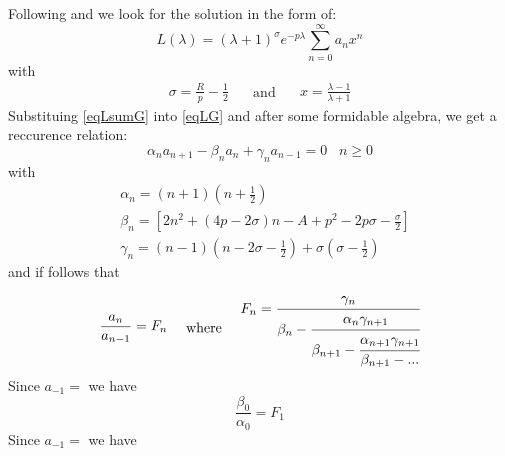 Following \cite{Bates1} and \cite{H2Plus2d2} we look for the solution in the form of:
\begin{equation}\label{eqLsumG}
L(\lambda) = \left(\lambda +1\right)^\sigma e^{-p\lambda}\sum_{n=0}^{\infty}{a_nx^n}
\end{equation}
with
\begin{equation}
\begin{split}
\sigma = \frac{R}{p} - \frac{1}{2}
\end{split}
\quad\text{ and }\quad
\begin{split}
x = \frac{\lambda-1}{\lambda+1}
\end{split}
\end{equation}
Substituing \eqref{eqLsumG} into \eqref{eqLG} and after some formidable algebra, we get a reccurence relation:
\begin{equation}
\alpha_na_{n+1}-\beta_n a_n+\gamma_na_{n-1} = 0\,\,\,\,\,n \ge 0
\end{equation}
with
\begin{equation}
\begin{split}
& \alpha_n = \left(n + 1\right)\left(n + \frac{1}{2}\right)\\[.8em]
& \beta_n = \left[2n^2 + (4p - 2\sigma)n - A + p^2 - 2p\sigma - \frac{\sigma}{2}\right] \\[.8em]
& \gamma_n = (n-1)\left(n - 2\sigma - \frac{1}{2}\right) + \sigma\left(\sigma - \frac{1}{2}\right)
\end{split}
\end{equation}
and if follows that
\begin{equation}
\begin{split}
\frac{a_n}{a_{n-1}} = F_n
\end{split}
\quad\text{ where }\quad
\begin{split}
F_n = \cfrac{\gamma_n}{\beta_n - \cfrac{\alpha_n \gamma_{n+1}}{\beta_{n+1}-\cfrac{\alpha_{n+1}\gamma_{n+1}}{\beta_{n+1}-\text{...}}}}
\end{split}
\end{equation}
Since $ a_{-1} = $ we have
\begin{equation}
\frac{\beta_0}{\alpha_0} = F_1
\end{equation}
Since $ a_{-1} = $ we have





